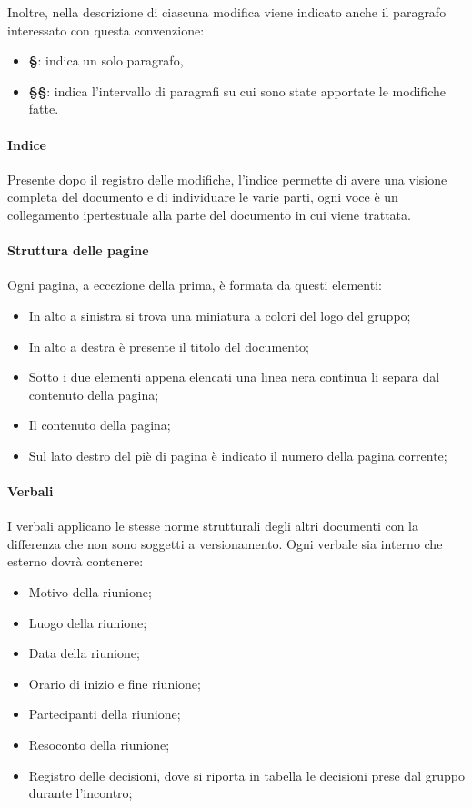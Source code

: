 Inoltre, nella descrizione di ciascuna modifica viene indicato anche il paragrafo interessato con questa convenzione: 
\begin{itemize}
    \item \textbf{\S{}}: indica un solo paragrafo,
    \item \textbf{\S{}\S{}}: indica l'intervallo di paragrafi su cui sono state apportate le modifiche fatte.
\end{itemize}

\paragraph{Indice}
Presente dopo il registro delle modifiche, l’indice permette di avere una visione completa del documento e di individuare le varie parti, ogni voce è un collegamento ipertestuale alla parte del documento in cui viene trattata.

\paragraph{Struttura delle pagine}
Ogni pagina, a eccezione della prima, è formata da questi elementi:
  \begin{itemize}
  		\item In alto a sinistra si trova una miniatura a colori del logo del gruppo;
  		\item In alto a destra è presente il titolo del documento;
  		\item Sotto i due elementi appena elencati una linea nera continua li separa dal contenuto della pagina;
  		\item Il contenuto della pagina;
  		\item Sul lato destro del piè di pagina è indicato il numero della pagina corrente;
	\end{itemize}
	
\paragraph{Verbali}
I verbali applicano le stesse norme strutturali degli altri documenti con la differenza che non sono soggetti a versionamento. Ogni verbale sia interno che esterno dovrà contenere:
\begin{itemize}
\item Motivo della riunione;
\item Luogo della riunione;
\item Data della riunione;
\item Orario di inizio e fine riunione;
\item Partecipanti della riunione;
\item Resoconto della riunione;
\item Registro delle decisioni, dove si riporta in tabella le decisioni prese dal gruppo durante l’incontro;
\end{itemize}  		

